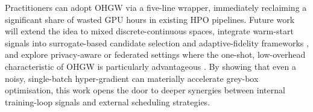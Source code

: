 \documentclass{article}
\begin{document}
Practitioners can adopt OHGW via a five-line wrapper, immediately reclaiming a significant share of wasted GPU hours in existing HPO pipelines. Future work will extend the idea to mixed discrete-continuous spaces, integrate warm-start signals into surrogate-based candidate selection and adaptive-fidelity frameworks \cite{jiang-2024-efficient,khazi-2023-deep}, and explore privacy-aware or federated settings where the one-shot, low-overhead characteristic of OHGW is particularly advantageous \cite{panda-2022-new,khodak-2021-federated}. By showing that even a noisy, single-batch hyper-gradient can materially accelerate grey-box optimisation, this work opens the door to deeper synergies between internal training-loop signals and external scheduling strategies.




\end{document}
